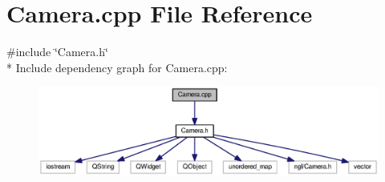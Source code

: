 \section{Camera.\-cpp File Reference}
\label{_camera_8cpp}
{\ttfamily \#include \char`\"{}Camera.\-h\char`\"{}}\\*
Include dependency graph for Camera.\-cpp\-:\nopagebreak
\begin{figure}[H]
\begin{center}
\leavevmode
\includegraphics[width=350pt]{_camera_8cpp__incl}
\end{center}
\end{figure}
